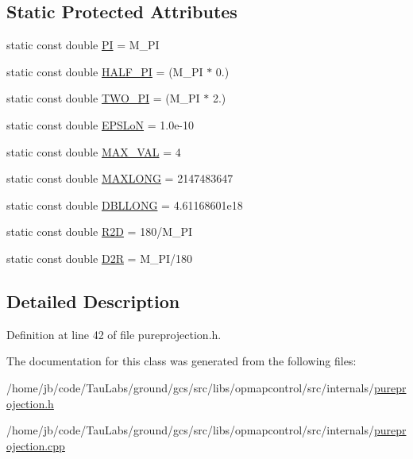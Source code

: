 \subsection*{\-Static \-Protected \-Attributes}
\begin{DoxyCompactItemize}
\item 
static const double \hyperlink{group___o_p_map_widget_gaab58a4dd2b2aec1a140df479c3da07c5}{\-P\-I} = \-M\-\_\-\-P\-I
\item 
static const double \hyperlink{group___o_p_map_widget_ga767800d1664d3a7d0255a1d1d55bea69}{\-H\-A\-L\-F\-\_\-\-P\-I} = (\-M\-\_\-\-P\-I $\ast$ 0.)
\item 
static const double \hyperlink{group___o_p_map_widget_gac2ca007c6c6f6c095902daca2254d4bb}{\-T\-W\-O\-\_\-\-P\-I} = (\-M\-\_\-\-P\-I $\ast$ 2.)
\item 
static const double \hyperlink{group___o_p_map_widget_ga48583ac82eb87f081f2dc32a9ab39349}{\-E\-P\-S\-Lo\-N} = 1.\-0e-\/10
\item 
static const double \hyperlink{group___o_p_map_widget_ga34e30a80435ba07c4e95b56f24935ceb}{\-M\-A\-X\-\_\-\-V\-A\-L} = 4
\item 
static const double \hyperlink{group___o_p_map_widget_gad58d07a94d560015458a3411190b5cc0}{\-M\-A\-X\-L\-O\-N\-G} = 2147483647
\item 
static const double \hyperlink{group___o_p_map_widget_gaffa95138ab57a5c0267eb66399bbdc5c}{\-D\-B\-L\-L\-O\-N\-G} = 4.\-61168601e18
\item 
static const double \hyperlink{group___o_p_map_widget_ga112e42b7b86260ce042d7c14b4ece2b7}{\-R2\-D} = 180/\-M\-\_\-\-P\-I
\item 
static const double \hyperlink{group___o_p_map_widget_ga52ec5ac7446a549728bf6e9c798ed6f6}{\-D2\-R} = \-M\-\_\-\-P\-I/180
\end{DoxyCompactItemize}


\subsection{\-Detailed \-Description}


\-Definition at line 42 of file pureprojection.\-h.



\-The documentation for this class was generated from the following files\-:\begin{DoxyCompactItemize}
\item 
/home/jb/code/\-Tau\-Labs/ground/gcs/src/libs/opmapcontrol/src/internals/\hyperlink{pureprojection_8h}{pureprojection.\-h}\item 
/home/jb/code/\-Tau\-Labs/ground/gcs/src/libs/opmapcontrol/src/internals/\hyperlink{pureprojection_8cpp}{pureprojection.\-cpp}\end{DoxyCompactItemize}
